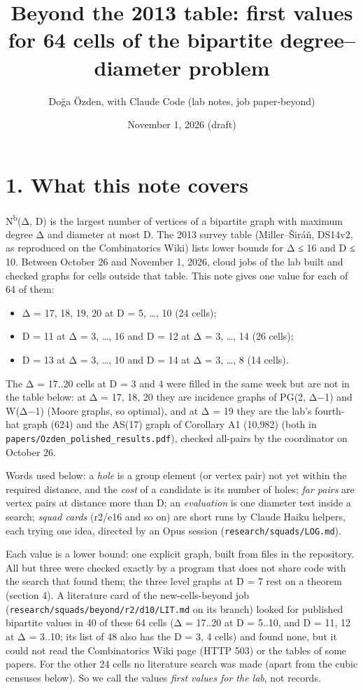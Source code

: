 \documentclass[
  10pt,
]{article}
\title{Beyond the 2013 table: first values for 64 cells of the bipartite degree--diameter problem}
\author{Doğa Özden, with Claude Code (lab notes, job paper-beyond)}
\date{November 1, 2026 (draft)}
\providecommand{\tightlist}{%
  \setlength{\itemsep}{0pt}\setlength{\parskip}{0pt}}
\begin{document}
\maketitle

\hypertarget{what-this-note-covers}{%
\section{1. What this note covers}\label{what-this-note-covers}}

N\textsuperscript{b}(Δ, D) is the largest number of vertices of a bipartite graph with maximum degree Δ and diameter
at most D. The 2013 survey table (Miller--Širáň, DS14v2, as reproduced on the Combinatorics Wiki) lists lower bounds
for Δ ≤ 16 and D ≤ 10. Between October 26 and November 1, 2026, cloud jobs of the lab built and checked graphs for
cells outside that table. This note gives one value for each of 64 of them:

\begin{itemize}
\tightlist
\item
  Δ = 17, 18, 19, 20 at D = 5, \ldots, 10 (24 cells);
\item
  D = 11 at Δ = 3, \ldots, 16 and D = 12 at Δ = 3, \ldots, 14 (26 cells);
\item
  D = 13 at Δ = 3, \ldots, 10 and D = 14 at Δ = 3, \ldots, 8 (14 cells).
\end{itemize}

The Δ = 17..20 cells at D = 3 and 4 were filled in the same week but are not in the table below: at Δ = 17, 18, 20
they are incidence graphs of PG(2, Δ−1) and W(Δ−1) (Moore graphs, so optimal), and at Δ = 19 they are the lab's
fourth-hat graph (624) and the AS(17) graph of Corollary A1 (10,982) (both in
\texttt{papers/\allowbreak{}Ozden\_\allowbreak{}polished\_\allowbreak{}results.pdf}), checked all-pairs by the coordinator on October 26.

Words used below: a \emph{hole} is a group element (or vertex pair) not yet within the required distance, and the
\emph{cost} of a candidate is its number of holes; \emph{far pairs} are vertex pairs at distance more than D; an
\emph{evaluation} is one diameter test inside a search; \emph{squad cards} (r2/e16 and so on) are short runs by Claude
Haiku helpers, each trying one idea, directed by an Opus session (\texttt{research/\allowbreak{}squads/\allowbreak{}LOG.md}).

Each value is a lower bound: one explicit graph, built from files in the repository. All but three were checked
exactly by a program that does not share code with the search that found them; the three level graphs at D = 7 rest on
a theorem (section 4). A literature card of the new-cells-beyond job (\texttt{research/\allowbreak{}squads/\allowbreak{}beyond/\allowbreak{}r2/\allowbreak{}d10/\allowbreak{}LIT.md} on
its branch) looked for published bipartite values in 40 of these 64 cells (Δ = 17..20 at D = 5..10, and D = 11, 12 at
Δ = 3..10; its list of 48 also has the D = 3, 4 cells) and found none, but it could not read the Combinatorics Wiki
page (HTTP 503) or the tables of some papers. For the other 24 cells no literature search was made (apart from the
cubic censuses below). So we call the values \emph{first values for the lab}, not records.
\end{document}
